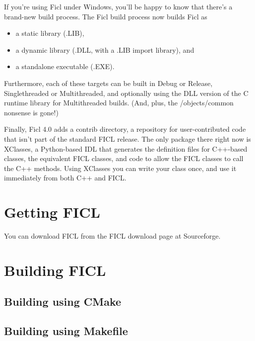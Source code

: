 If you're using Ficl under Windows, you'll be happy to know that there's
a brand-new build process. The Ficl build process now builds Ficl as
\begin{itemize}[noitemsep]
	\item a static library (.LIB),
	\item a dynamic library (.DLL, with a .LIB import library), and
	\item a standalone executable (.EXE).
\end{itemize}
Furthermore, each of these targets can be built in Debug or Release,
Singlethreaded or Multithreaded, and optionally using the DLL version
of the C runtime library for Multithreaded builds. (And, plus, the
/objects/common nonsense is gone!)

Finally, Ficl 4.0 adds a contrib directory, a repository for
user-contributed code that isn't part of the standard FICL release. The
only package there right now is XClasses, a Python-based IDL that
generates the definition files for C++-based classes, the equivalent
FICL classes, and code to allow the FICL classes to call the C++ methods.
Using XClasses you can write your class once, and use it immediately
from both C++ and FICL.

\section{Getting FICL}
You can download FICL from the FICL download page at Sourceforge.

\section{Building FICL}
\subsection{Building using CMake}
\subsection{Building using Makefile}
